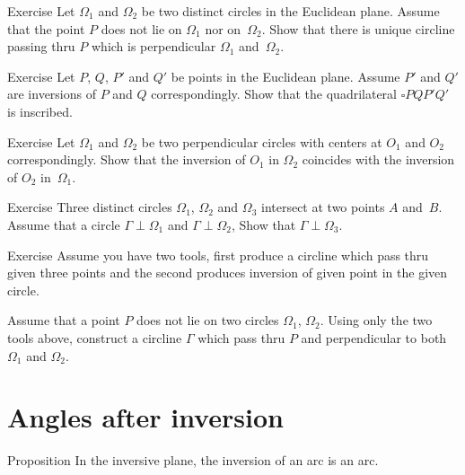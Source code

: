 \begin{thm}{Exercise}\label{ex:cline-perp-to-two}
Let $\Omega_1$ and $\Omega_2$ be two distinct circles in the Euclidean plane.
Assume that the point $P$ does not lie on $\Omega_1$ nor on~$\Omega_2$.
Show that there is unique circline passing thru $P$ which is perpendicular $\Omega_1$ and~$\Omega_2$.
\end{thm}

\begin{thm}{Exercise}\label{ex:inscribed+inv}
Let $P$, $Q$, $P'$ and $Q'$ be points in the Euclidean plane.
Assume $P'$ and $Q'$ are inversions 
of $P$ and $Q$ correspondingly.
Show that the quadrilateral $\square PQP'Q'$ is inscribed.
\end{thm}

\begin{thm}{Exercise}\label{ex:centers-of-perp-circles}
Let $\Omega_1$ and $\Omega_2$ be two perpendicular circles with centers at $O_1$ and $O_2$ correspondingly.
Show that the inversion of $O_1$ in $\Omega_2$ 
coincides with 
the inversion of $O_2$ in~$\Omega_1$.
\end{thm}

\begin{thm}{Exercise}\label{ex:4-th-perp-circ}
Three distinct circles $\Omega_1$, $\Omega_2$ and $\Omega_3$ intersect at two points $A$ and~$B$.
Assume that a circle $\Gamma\perp\Omega_1$ and $\Gamma\perp\Omega_2$,
Show that $\Gamma\perp\Omega_3$.
\end{thm}

\begin{thm}{Exercise}\label{ex:construction-perp-clines}
Assume you have two tools,
first produce a circline which pass thru given three points 
and the second produces inversion of given point in the given circle.

Assume that a point $P$ does not lie on two circles $\Omega_1$, $\Omega_2$.
Using only the two tools above,
construct a circline $\Gamma$ which pass thru $P$ 
and perpendicular to both $\Omega_1$ and $\Omega_2$.
\end{thm}

\section*{Angles after inversion}

\begin{thm}{Proposition}
In the inversive plane,
the inversion of an arc is an arc.
\end{thm}

